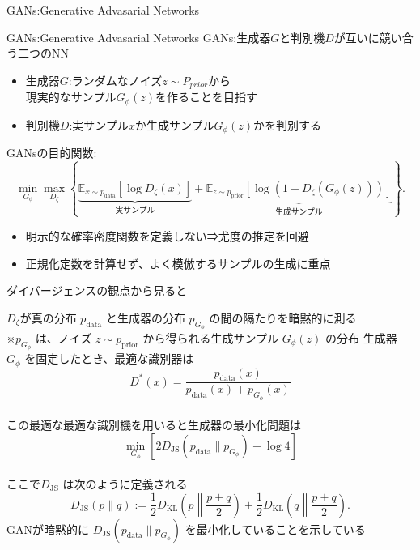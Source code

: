 \begin{frame}{GANs:Generative Advasarial Networks}
    \begin{block}{GANs:Generative Advasarial Networks}
        GANs:生成器$\mathit{G}$と判別機$\mathit{D}$が互いに競い合う二つのNN\\
        \begin{itemize}
        \item 生成器$\mathit{G}$:ランダムなノイズ$\mathit{z}\sim P_{prior}$から\\現実的なサンプル$\mathit{G}_{\phi}(z)$を作ることを目指す
        \item 判別機$\mathit{D}$:実サンプル$\mathit{x}$か生成サンプル$\mathit{G}_{\phi}(z)$かを判別する
        \end{itemize}
        GANsの目的関数:\\
        \[\min_{G_\phi}\max_{D_\zeta}\left\{\underbrace{\mathbb{E}_{x\sim p_{\mathrm{data}}}[\log D_\zeta(x)]}_{\text{実サンプル}}+\underbrace{\mathbb{E}_{z\sim p_{\mathrm{prior}}}\left[\log\left(1-D_\zeta(G_\phi(z))\right)\right]}_{\text{生成サンプル}}\right\}.\]
        \begin{itemize}
            \item 明示的な確率密度関数を定義しない⇒尤度の推定を回避\\
            \item 正規化定数を計算せず、よく模倣するサンプルの生成に重点\\
        \end{itemize}
    \end{block}
\end{frame}
\begin{frame}{ダイバージェンスの観点から見ると}
    \begin{exampleblock}{}
        \small $\mathit{D_\zeta}$が真の分布 \(p_{\mathrm{data}}\) と生成器の分布 \(p_{G_\phi}\) の間の隔たりを暗黙的に測る\\
        ※\(p_{G_\phi}\) は、ノイズ \(z\sim p_{\mathrm{prior}}\) から得られる生成サンプル \(G_\phi(z)\) の分布
        生成器 \(G_\phi\) を固定したとき、最適な識別器は\\
        \[D^*(x)=\frac{p_{\mathrm{data}}(x)}{p_{\mathrm{data}}(x)+p_{G_\phi}(x)}\]\\
        この最適な最適な識別機を用いると生成器の最小化問題は\\
        \[\min_{G_\phi}\left[2D_{\mathrm{JS}}(p_{\mathrm{data}}\|p_{G_\phi})-\log 4\right]\]\\
        ここで\(D_{\mathrm{JS}}\) は次のように定義される\\
        \[D_{\mathrm{JS}}(p\|q):=\frac12D_{\mathrm{KL}}\left(p\middle\|\frac{p+q}{2}\right)+\frac12D_{\mathrm{KL}}\left(q\middle\|\frac{p+q}{2}\right).\]
        GANが暗黙的に \(D_{\mathrm{JS}}(p_{\mathrm{data}}\|p_{G_\phi})\) を最小化していることを示している\\
    \end{exampleblock}
\end{frame}

